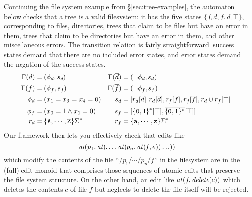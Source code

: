 Continuing the file system example from \S\ref{sec:tree-examples},
the automaton below checks that a tree is a valid filesystem; it
has the five states $\{f, d, \overline f, \overline d, \top\}$,
corresponding to files, directories, trees that claim to be files but have
an error in them, trees that claim to be directories but have an error in
them, and other miscellaneous errors. The transition relation is fairly
straightforward; success states demand that there are no included error
states, and error states demand the negation of the success states.
\begin{align*}
    \Gamma(d) &= (\phi_d,s_d) &
    \Gamma(\overline d) &= (\lnot \phi_d,s_d) \\
    \Gamma(f) &= (\phi_f,s_f) &
    \Gamma(\overline f) &= (\lnot \phi_f,s_f) \\
    \phi_d &= (x_1 = x_3 = x_4 = 0) &
    s_d &=
        [r_d[d]
        ,r_d[\overline d]
        ,r_f[f]
        ,r_f[\overline f]
        ,\overline{r_d\cup r_f}[\top]
        ] \\
    \phi_f &= (x_0 = 1 \land x_1 = 0) &
    s_f &=
        [          \{\mathtt{0},\mathtt{1}\}^* [\top]
        ,\overline{\{\mathtt{0},\mathtt{1}\}^*}[\top]
        ] \\
    r_d &= \{\mathtt{A},\cdots,\mathtt{Z}\}\Sigma^* &
    r_f &= \{\mathtt{a},\cdots,\mathtt{z}\}\Sigma^*
\end{align*}
Our framework then lets you effectively check that edits like
\[\mathit{at}(p_1,\mathit{at}(\ldots,\mathit{at}(p_n,\mathit{at}(f,e))\ldots))\]
which modify the contents of the file ``/$p_1$/$\cdots$/$p_n$/$f$'' in the
filesystem are in the (full) edit monoid that comprises those sequences of
atomic edits that preserve the file system structure. On the other hand, an
edit like $\mathit{at}(f,\mathit{delete}(c))$ which deletes the contents $c$ of file $f$ but
neglects to delete the file itself will be rejected.

